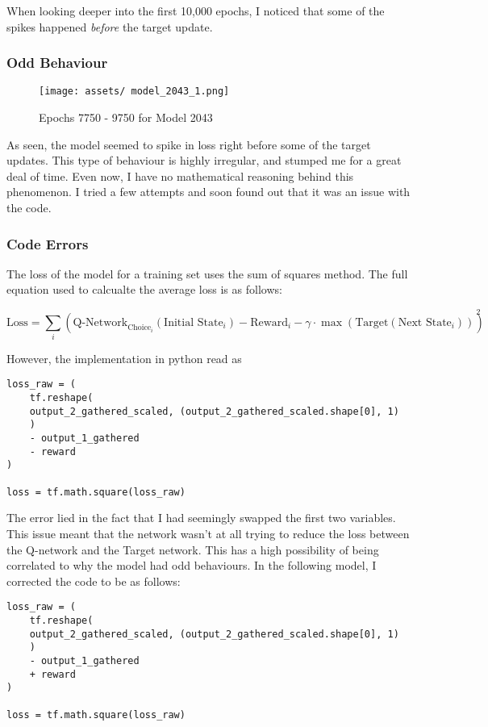 \documentclass[12pt]{article}
\begin{document}
When looking deeper into the first 10,000 epochs, I noticed that some of the spikes happened \textit{before} the target update.

\subsubsection{Odd Behaviour}

\begin{figure}[h]
	\centering
	\texttt{[image: assets/ model\_2043\_1.png]}
	\caption{Epochs 7750 - 9750 for Model 2043}
\end{figure}

As seen, the model seemed to spike in loss right before some of the target updates. This type of behaviour is highly irregular, and stumped me for a great deal of time. Even now, I have no mathematical reasoning behind this phenomenon. I tried a few attempts and soon found out that it was an issue with the code. 

\newpage

\subsubsection{Code Errors}

The loss of the model for a training set uses the sum of squares method. The full equation used to calcualte the average loss is as follows:

$$\text{Loss} = \sum_{i}{(\text{Q-Network}_{\text{Choice}_i}(\text{Initial State}_i) - \text{Reward}_i - \gamma \cdot \max{(\text{Target}(\text{Next State}_i))})^2}$$


However, the implementation in python read as 

\begin{verbatim}
loss_raw = (
	tf.reshape(
  	output_2_gathered_scaled, (output_2_gathered_scaled.shape[0], 1)
 	)
 	- output_1_gathered
 	- reward
)

loss = tf.math.square(loss_raw)
\end{verbatim}

The error lied in the fact that I had seemingly swapped the first two variables. This issue meant that the network wasn't at all trying to reduce the loss between the Q-network and the Target network. This has a high possibility of being correlated to why the model had odd behaviours. In the following model, I corrected the code to be as follows:



\begin{verbatim}
loss_raw = (
	tf.reshape(
  	output_2_gathered_scaled, (output_2_gathered_scaled.shape[0], 1)
 	)
 	- output_1_gathered
 	+ reward
)

loss = tf.math.square(loss_raw)
\end{verbatim}
\end{document}

